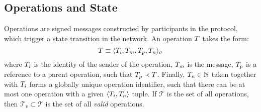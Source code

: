\subsection{Operations and State}
\label{operations-and-state}



Operations are signed messages constructed by participants in the protocol,
which trigger a state transition in the network. An operation $T$ takes
the form:
\[
    T \equiv \langle T_i, T_m, T_p, T_n \rangle_{\sigma}
\]
where $T_i$ is the identity of the sender of the operation, $T_m$ is the
message, $T_p$ is a reference to a parent operation, such that $T_p \prec
T$. Finally, $T_n \in \mathbb{N}$ taken together with $T_i$ forms a
globally unique operation identifier, such that there can be at most one
operation with a given $\langle T_i, T_n \rangle$ tuple. If $\mathcal{T}$ is the
set of all operations, then $\mathcal{T}_v \subset \mathcal{T}$ is the set of all \emph{valid}
operations.

